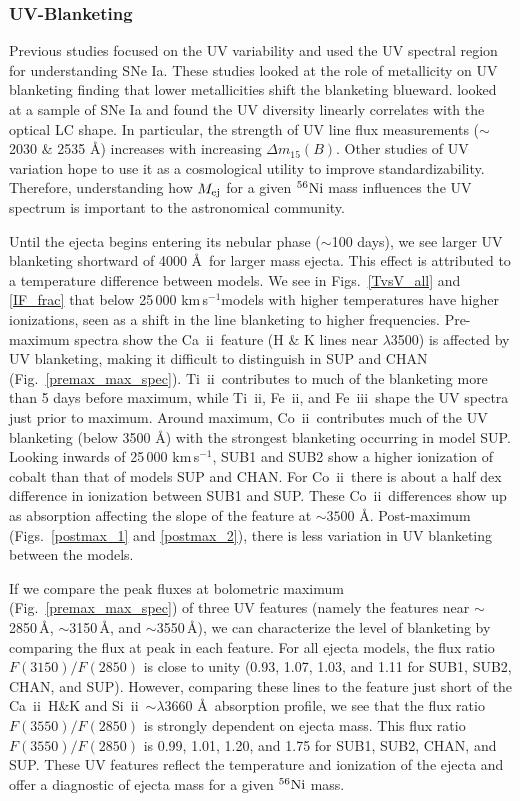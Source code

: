 \documentclass[useAMS,usenatbib,useasmath]{mnras}
\newcommand{\kms}{\hbox{km$\,$s$^{-1}$}}
\newcommand{\elem}[2][default]{$^{#1}{\rm #2}$}
\newcommand{\caii}{\mbox{Ca~{\sc ii}}}
\newcommand{\skii}{\mbox{Si~{\sc ii}}}
\newcommand{\tkii}{\mbox{Ti~{\sc ii}}}
\newcommand{\feii}{\mbox{Fe~{\sc ii}}}
\newcommand{\feiii}{\mbox{Fe~{\sc iii}}}
\newcommand{\coii}{\mbox{Co~{\sc ii}}}
\newcommand{\lb}{$\lambda$}
\def\fig{Fig.}
\def\figs{Figs.}
\begin{document}
\subsubsection{UV-Blanketing}%
Previous studies focused on the UV variability and used the UV spectral region for understanding SNe Ia. These studies looked at the role of metallicity on UV blanketing \citep{Lentz2000,Walker2012,Wang2012,Foley2013} finding that lower metallicities shift the blanketing blueward. \cite{Foley2016} looked at a sample of SNe Ia and found the UV diversity linearly correlates with the optical LC shape. In particular, the strength of UV line flux measurements ($\sim$2030 \& 2535 \AA) increases with increasing $\Delta m_{15}(B)$. Other studies of UV variation hope to use it as a cosmological utility \citep{Ellis2008,Sullivan2009} to improve standardizability. 
Therefore, understanding how $M_{\rm ej}$ for a given \elem[56]{Ni} mass influences the UV spectrum is important to the astronomical community.

Until the ejecta begins entering its nebular phase ($\sim$100 days), we see larger UV blanketing shortward of 4000 \AA\ for larger mass ejecta. This effect is attributed to a temperature difference between models. We see in \figs~\ref{TvsV_all} and \ref{IF_frac} that below 25\,000 \kms models with higher temperatures have higher ionizations, seen as a shift in the line blanketing to higher frequencies. Pre-maximum spectra show the \caii\ feature (H \& K lines near \lb3500) is affected by UV blanketing, making it difficult to distinguish in SUP and CHAN (\fig~\ref{premax_max_spec}). \tkii\ contributes to much of the blanketing more than 5 days before maximum, while \tkii, \feii, and \feiii\ shape the UV spectra just prior to maximum. Around maximum, \coii\ contributes much of the UV blanketing (below 3500 \AA) with the strongest blanketing occurring in model SUP. Looking inwards of 25\,000 \kms, SUB1 and SUB2 show a higher ionization of cobalt than that of models SUP and CHAN. For \coii\ there is about a half dex difference in ionization between SUB1 and SUP. These \coii\ differences show up as absorption affecting the slope of the feature at $\sim3500$ \AA. Post-maximum (\figs~\ref{postmax_1} and \ref{postmax_2}), there is less variation in UV blanketing between the models.

If we compare the peak fluxes at bolometric maximum (\fig~\ref{premax_max_spec}) of three UV features (namely the features near $\sim$2850\,\AA, $\sim$3150\,\AA, and $\sim$3550\,\AA), we can characterize the level of blanketing by comparing the flux at peak in each feature. For all ejecta models, the flux ratio $F(3150)/F(2850)$ is close to unity (0.93, 1.07, 1.03, and 1.11 for SUB1, SUB2, CHAN, and SUP). However, comparing these lines to the feature just short of the \caii\ H\&K and \skii\ $\sim$\lb3660 \AA\ absorption profile, we see that the flux ratio $F(3550)/F(2850)$ is strongly dependent on ejecta mass. This flux ratio $F(3550)/F(2850)$ is 0.99, 1.01, 1.20, and 1.75 for SUB1, SUB2, CHAN, and SUP. These UV features reflect the temperature and ionization of the ejecta and offer a diagnostic of ejecta mass for a given \elem[56]{Ni} mass. 
\end{document}
